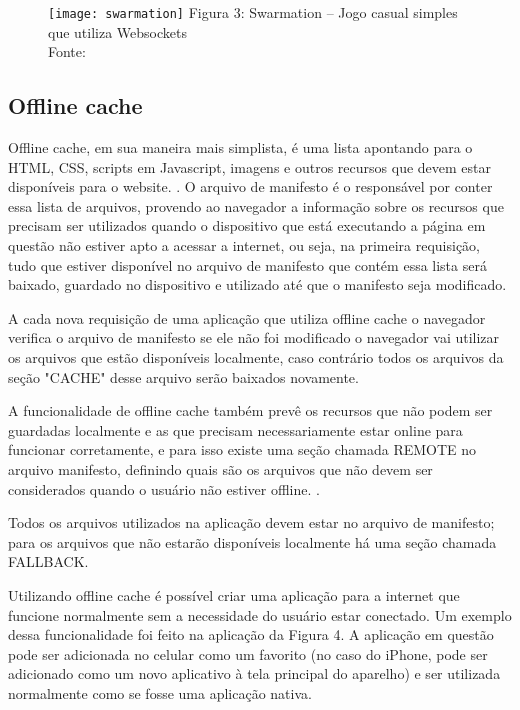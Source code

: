 \begin{figure}[H]
  \centering
	\texttt{[image: swarmation]}
	\footnotesize\hspace{8\baselineskip}
	Figura 3: Swarmation {--} Jogo casual simples que utiliza Websockets \\
	Fonte: \cite{website:swarmation}
  \label{img:swarmation}
\end{figure}


\subsection{Offline cache}

Offline cache, em sua maneira mais simplista, é uma lista apontando
para o HTML, CSS, scripts em Javascript, imagens e outros recursos que devem
estar disponíveis para o website. \cite{pilgrim2010html5}. O arquivo de
manifesto é o responsável por conter essa lista de arquivos, provendo
ao navegador a informação sobre os recursos que
precisam ser utilizados quando o dispositivo que está executando a
página em questão não estiver apto a acessar a internet, ou seja,
na primeira requisição, tudo que estiver disponível no arquivo de manifesto
que contém essa lista será baixado, guardado no dispositivo e utilizado até
que o manifesto seja modificado.

A cada nova requisição de uma aplicação que utiliza offline cache o
navegador verifica o arquivo de manifesto se ele não foi modificado
o navegador vai utilizar os arquivos que estão disponíveis localmente,
caso contrário todos os arquivos da seção "CACHE" desse arquivo serão baixados novamente.

A funcionalidade de offline cache também prevê os recursos que não
podem ser guardadas localmente e as que precisam
necessariamente estar online para funcionar corretamente, e para isso
existe uma seção chamada REMOTE no arquivo manifesto, definindo quais
são os arquivos que não devem ser considerados quando o usuário não
estiver offline. \cite{appcache01}.

Todos os arquivos utilizados na aplicação devem estar no arquivo de
manifesto; para os arquivos que não estarão disponíveis localmente há
uma seção chamada FALLBACK.

Utilizando offline cache é possível criar uma aplicação para a
internet que funcione normalmente sem a necessidade do usuário estar
conectado. Um exemplo dessa funcionalidade foi feito na aplicação da
Figura 4. A aplicação em questão pode ser adicionada
no celular como um favorito (no caso do iPhone, pode ser adicionado
como um novo aplicativo à tela principal do aparelho) e ser utilizada
normalmente como se fosse uma aplicação nativa.

